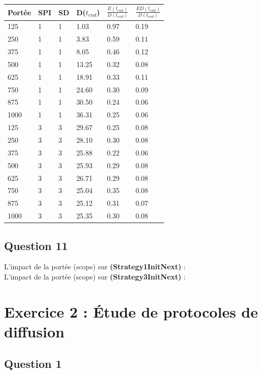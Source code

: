 \documentclass[10pt]{report}
\begin{document}
\begin{center}
\captionsetup{type=figure}
\begin{tabular}{|l|l|l|l|l|l|} \hline
  	Portée & SPI & SD & D($t_{end}$) & $\frac{E(t_{end})}{D(t_{end})}$ & $\frac{ED(t_{end})}{D(t_{end})}$\\ \hline
	125 & 1 & 1 & 1.03 & 0.97 & 0.19\\ \hline
	250 & 1 & 1 & 3.83 & 0.59 & 0.11\\ \hline
	375 & 1 & 1 & 8.05 & 0.46 & 0.12\\ \hline
	500 & 1 & 1 & 13.25 & 0.32 & 0.08\\ \hline
	625 & 1 & 1 & 18.91 & 0.33 & 0.11\\ \hline
	750 & 1 & 1 & 24.60 & 0.30 & 0.09\\ \hline
	875 & 1 & 1 & 30.50 & 0.24 & 0.06\\ \hline
	1000 & 1 & 1 & 36.31 & 0.25 & 0.06\\ \hline
	125 & 3 & 3 & 29.67 & 0.25 & 0.08\\ \hline
	250 & 3 & 3 & 28.10 & 0.30 & 0.08\\ \hline
	375 & 3 & 3 & 25.88 & 0.22 & 0.06\\ \hline
	500 & 3 & 3 & 25.93 & 0.29 & 0.08\\ \hline
	625 & 3 & 3 & 26.71 & 0.29 & 0.08\\ \hline
	750 & 3 & 3 & 25.04 & 0.35 & 0.08\\ \hline
	875 & 3 & 3 & 25.12 & 0.31 & 0.07\\ \hline
	1000 & 3 & 3 & 25.35 & 0.30 & 0.08\\ \hline
\end{tabular}
\end{center}

\subsection{Question 11}

L'impact de la portée (scope) sur \textbf{(Strategy1InitNext)} :\\

L'impact de la portée (scope) sur \textbf{(Strategy3InitNext)} :\\

\newpage
\section{Exercice 2 : Étude de protocoles de diffusion}
\subsection{Question 1}
\end{document}
